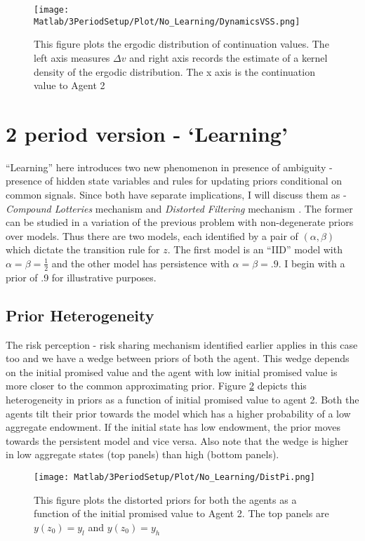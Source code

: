 \documentclass[12pt]{article}
\begin{document}
\begin{figure}[htbp]
\centering
	  \texttt{[image: Matlab/3PeriodSetup/Plot/No\_Learning/DynamicsVSS.png]}

	\caption{This figure plots the ergodic distribution of continuation values. The left axis measures $\Delta v$ and right axis records the estimate of a kernel density of the ergodic distribution. The x axis is the continuation value to Agent 2}
	\label{fig:DynamicsVSS}
\end{figure} 



\section{2 period version - `Learning'}
``Learning'' here introduces two new phenomenon in presence of ambiguity - presence of hidden state variables and rules for updating priors conditional on common signals.  Since both have separate implications, I will discuss them as - \emph{Compound Lotteries} mechanism and \emph{Distorted Filtering }mechanism .  The former can be studied in a variation of the previous problem with non-degenerate priors over models. Thus there are two models, each identified by a pair of $(\alpha, \beta)$ which dictate the transition rule for $z$.  The first model is an ``IID'' model with $\alpha=\beta=\frac{1}{2}$ and the other model has persistence with $\alpha=\beta=.9$. I begin with a prior of .9 for illustrative purposes. 
\subsection{Prior Heterogeneity}
\noindent The risk perception - risk sharing mechanism identified earlier applies in this case too and we have a wedge between priors of both the agent. This wedge depends on the initial promised value and the agent with low initial promised value is more closer to the common approximating prior. Figure \ref{fig:DistPi} depicts this heterogeneity  in priors as a function of initial promised value to agent 2. Both the agents tilt their prior towards the model which has a higher probability of a low aggregate endowment. If the initial state has low endowment, the prior moves towards the persistent model and vice versa. Also note that the wedge is higher in low aggregate states (top panels) than high (bottom panels).
\begin{figure}[htbp]
\centering
	  \texttt{[image: Matlab/3PeriodSetup/Plot/No\_Learning/DistPi.png]}

	\caption{This figure plots the distorted priors for both the agents as a function of the initial promised value to Agent 2. The top panels are $y(z_0)=y_{l}$ and $y(z_0)=y_{h}$ }
	\label{fig:DistPi}
\end{figure} 
\end{document}
